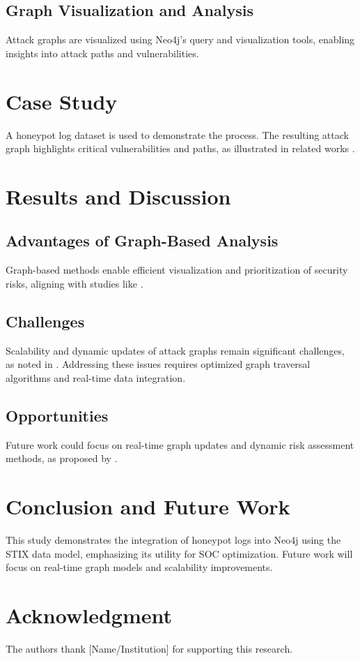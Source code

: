 \documentclass[conference]{IEEEtran}
\begin{document}
\subsection{Graph Visualization and Analysis}
Attack graphs are visualized using Neo4j's query and visualization tools, enabling insights into attack paths and vulnerabilities.

\section{Case Study}
A honeypot log dataset is used to demonstrate the process. The resulting attack graph highlights critical vulnerabilities and paths, as illustrated in related works \cite{banati2022attackgraphs}.

\section{Results and Discussion}
\subsection{Advantages of Graph-Based Analysis}
Graph-based methods enable efficient visualization and prioritization of security risks, aligning with studies like \cite{banati2022attackgraphs}.

\subsection{Challenges}
Scalability and dynamic updates of attack graphs remain significant challenges, as noted in \cite{simonnagy2022attackgraphs}. Addressing these issues requires optimized graph traversal algorithms and real-time data integration.


\subsection{Opportunities}
Future work could focus on real-time graph updates and dynamic risk assessment methods, as proposed by \cite{neo4jguide}.

\section{Conclusion and Future Work}
This study demonstrates the integration of honeypot logs into Neo4j using the STIX data model, emphasizing its utility for SOC optimization. Future work will focus on real-time graph models and scalability improvements.

\section*{Acknowledgment}
The authors thank [Name/Institution] for supporting this research.



\end{document}
